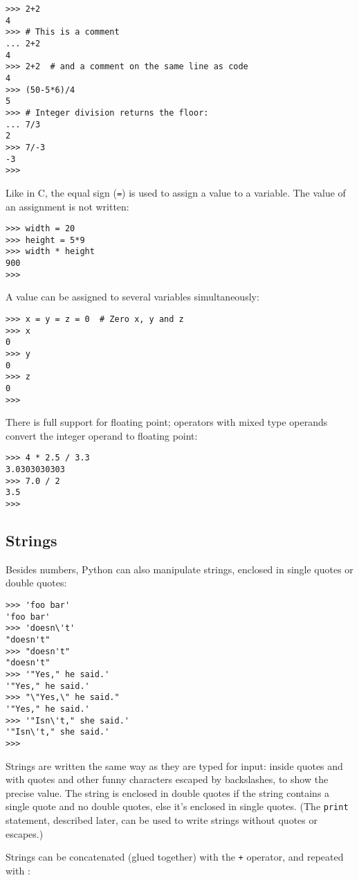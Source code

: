 \bcode\begin{verbatim}
>>> 2+2
4
>>> # This is a comment
... 2+2
4
>>> 2+2  # and a comment on the same line as code
4
>>> (50-5*6)/4
5
>>> # Integer division returns the floor:
... 7/3
2
>>> 7/-3
-3
>>> 
\end{verbatim}\ecode
%
Like in C, the equal sign ({\tt =}) is used to assign a value to a
variable.  The value of an assignment is not written:

\bcode\begin{verbatim}
>>> width = 20
>>> height = 5*9
>>> width * height
900
>>> 
\end{verbatim}\ecode
%
A value can be assigned to several variables simultaneously:

\bcode\begin{verbatim}
>>> x = y = z = 0  # Zero x, y and z
>>> x
0
>>> y
0
>>> z
0
>>> 
\end{verbatim}\ecode
%
There is full support for floating point; operators with mixed type
operands convert the integer operand to floating point:

\bcode\begin{verbatim}
>>> 4 * 2.5 / 3.3
3.0303030303
>>> 7.0 / 2
3.5
>>> 
\end{verbatim}\ecode

\subsection{Strings}

Besides numbers, Python can also manipulate strings, enclosed in
single quotes or double quotes:

\bcode\begin{verbatim}
>>> 'foo bar'
'foo bar'
>>> 'doesn\'t'
"doesn't"
>>> "doesn't"
"doesn't"
>>> '"Yes," he said.'
'"Yes," he said.'
>>> "\"Yes,\" he said."
'"Yes," he said.'
>>> '"Isn\'t," she said.'
'"Isn\'t," she said.'
>>> 
\end{verbatim}\ecode
%
Strings are written the same way as they are typed for input: inside
quotes and with quotes and other funny characters escaped by backslashes,
to show the precise value.  The string is enclosed in double quotes if
the string contains a single quote and no double quotes, else it's
enclosed in single quotes.  (The {\tt print} statement, described later,
can be used to write strings without quotes or escapes.)

Strings can be concatenated (glued together) with the {\tt +}
operator, and repeated with {\tt *}:

